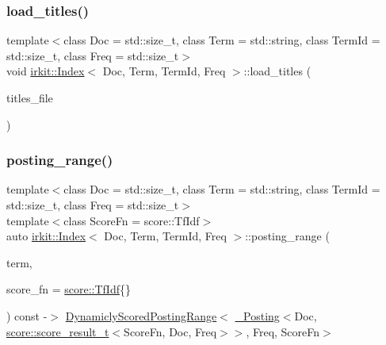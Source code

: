 \mbox{\label{classirkit_1_1Index_acd33c3a279e165a71594843d70e281f1}} 
\subsubsection{\texorpdfstring{load\+\_\+titles()}{load\_titles()}}
{\footnotesize\ttfamily template$<$class Doc  = std\+::size\+\_\+t, class Term  = std\+::string, class Term\+Id  = std\+::size\+\_\+t, class Freq  = std\+::size\+\_\+t$>$ \\
void \mbox{\hyperlink{classirkit_1_1Index}{irkit\+::\+Index}}$<$ Doc, Term, Term\+Id, Freq $>$\+::load\+\_\+titles (\begin{DoxyParamCaption}\item[{fs\+::path}]{titles\+\_\+file }\end{DoxyParamCaption})\hspace{0.3cm}{\ttfamily [inline]}}

\mbox{\label{classirkit_1_1Index_a931de856b06aac7957f7182048e8e852}} 
\subsubsection{\texorpdfstring{posting\+\_\+range()}{posting\_range()}\hspace{0.1cm}{\footnotesize\ttfamily [1/2]}}
{\footnotesize\ttfamily template$<$class Doc  = std\+::size\+\_\+t, class Term  = std\+::string, class Term\+Id  = std\+::size\+\_\+t, class Freq  = std\+::size\+\_\+t$>$ \\
template$<$class Score\+Fn  = score\+::\+Tf\+Idf$>$ \\
auto \mbox{\hyperlink{classirkit_1_1Index}{irkit\+::\+Index}}$<$ Doc, Term, Term\+Id, Freq $>$\+::posting\+\_\+range (\begin{DoxyParamCaption}\item[{const std\+::string \&}]{term,  }\item[{Score\+Fn}]{score\+\_\+fn = {\ttfamily \mbox{\hyperlink{structirkit_1_1score_1_1TfIdf}{score\+::\+Tf\+Idf}}\{\}} }\end{DoxyParamCaption}) const -\/$>$ \mbox{\hyperlink{classirkit_1_1DynamiclyScoredPostingRange}{Dynamicly\+Scored\+Posting\+Range}}$<$
            \mbox{\hyperlink{structirkit_1_1__Posting}{\+\_\+\+Posting}}$<$Doc, \mbox{\hyperlink{namespaceirkit_1_1score_ab6226695d6d5c54c84fcf2cb8e90c8b3}{score\+::score\+\_\+result\+\_\+t}}$<$Score\+Fn, Doc, Freq$>$$>$,
            Freq,
            Score\+Fn$>$
    \hspace{0.3cm}{\ttfamily [inline]}}

